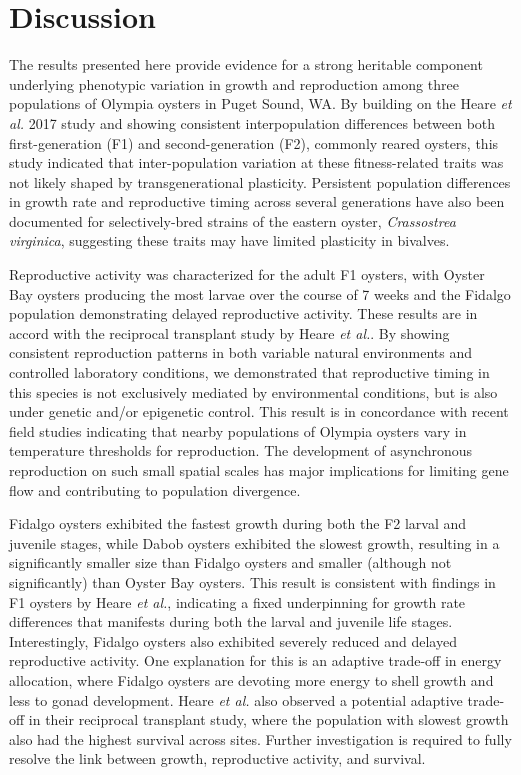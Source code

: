 \documentclass[10pt,letterpaper]{article}
\begin{document}
\section*{Discussion}
The results presented here provide evidence for a strong heritable component underlying phenotypic variation in growth and reproduction among three populations of Olympia oysters in Puget Sound, WA. By building on the Heare \textit{et al.} 2017 study and showing consistent interpopulation differences between both first-generation (F1) and second-generation (F2), commonly reared oysters, this study indicated that inter-population variation at these fitness-related traits was not likely shaped by transgenerational plasticity. Persistent population differences in growth rate and reproductive timing across several generations have also been documented for selectively-bred strains of the eastern oyster, \textit{Crassostrea virginica}\cite{Dittman1998-xm,Barber1991-og}, suggesting these traits may have limited plasticity in bivalves.\par
Reproductive activity was characterized for the adult F1 oysters, with Oyster Bay oysters producing the most larvae over the course of 7 weeks and the Fidalgo population demonstrating delayed reproductive activity. These results are in accord with the reciprocal transplant study by Heare \textit{et al.}. By showing consistent reproduction patterns in both variable natural environments and controlled laboratory conditions, we demonstrated that reproductive timing in this species is not exclusively mediated by environmental conditions, but is also under genetic and/or epigenetic control. This result is in concordance with recent field studies indicating that nearby populations of Olympia oysters vary in temperature thresholds for reproduction\cite{Barber2016-ws,Seale2009-uw}. The development of asynchronous reproduction on such small spatial scales has major implications for limiting gene flow and contributing to population divergence\cite{Palumbi1994-rv}.\par
Fidalgo oysters exhibited the fastest growth during both the F2 larval and juvenile stages, while Dabob oysters exhibited the slowest growth, resulting in a significantly smaller size than Fidalgo oysters and smaller (although not significantly) than Oyster Bay oysters. This result is consistent with findings in F1 oysters by Heare \textit{et al.}, indicating a fixed underpinning for growth rate differences that manifests during both the larval and juvenile life stages. Interestingly, Fidalgo oysters also exhibited severely reduced and delayed reproductive activity. One explanation for this is an adaptive trade-off in energy allocation\cite{Perrin1993-wa,Folkvord2014-jj}, where Fidalgo oysters are devoting more energy to shell growth and less to gonad development. Heare \textit{et al.} also observed a potential adaptive trade-off in their reciprocal transplant study, where the population with slowest growth also had the highest survival across sites. Further investigation is required to fully resolve the link between growth, reproductive activity, and survival.\par
\end{document}
